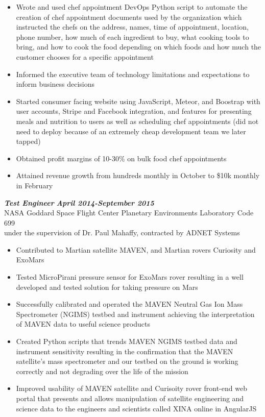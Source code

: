 \documentclass{res}
\begin{document}
\begin{resume}
\begin{itemize}
		\item Wrote and used chef appointment DevOps Python script to automate the creation of chef appointment documents used by the organization which instructed the chefs on the address, names, time of appointment, location, phone number, how much of each ingredient to buy, what cooking tools to bring, and how to cook the food depending on which foods and how much the customer chooses for a specific appointment
		\item Informed the executive team of technology limitations and expectations to inform business decisions
		\item Started consumer facing website using JavaScript, Meteor, and Boostrap with user accounts, Stripe and Facebook integration, and features for presenting meals and nutrition to users as well as scheduling chef appointments (did not need to deploy because of an extremely cheap development team we later tapped)
                \item Obtained profit margins of 10-30\% on bulk food chef appointments
		\item Attained revenue growth from hundreds monthly in October to \$10k monthly in February
                \end{itemize}
	{\bfseries {\em Test Engineer}}  \hfill  {\bfseries{\em April 2014-September 2015}}\\
		NASA Goddard Space Flight Center Planetary Environments Laboratory Code 699\\
                under the supervision of Dr. Paul Mahaffy, contracted by ADNET Systems
                \begin{itemize}  \itemsep -2pt %
                \item Contributed to Martian satellite MAVEN, and Martian rovers Curiosity and ExoMars
		\item Tested MicroPirani pressure sensor for ExoMars rover resulting in a well developed and tested solution for taking pressure on Mars
		\item Successfully calibrated and operated the MAVEN Neutral Gas Ion Mass Spectrometer (NGIMS) testbed and instrument  achieving the interpretation of MAVEN data to useful science products
		\item Created Python scripts that trends MAVEN NGIMS testbed data and instrument sensitivity resulting in the confirmation that the MAVEN satellite's mass spectrometer and our testbed on the ground is working correctly and not degrading over the life of the mission
		\item Improved usability of MAVEN satellite and Curisoity rover front-end web portal that presents and allows manipulation of satellite engineering and science data to the engineers and scientists called XINA online in AngularJS
                \end{itemize}


\end{resume}
\end{document}

